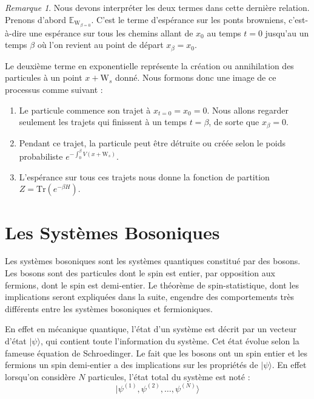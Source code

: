 \documentclass[11pt]{article}
\theoremstyle{definition}
\theoremstyle{remark}
\newtheorem*{remark}{Remarque}
\begin{document}
\begin{remark}
Nous devons interpréter les deux termes dans cette dernière relation. Prenons d'abord $\mathbb{E}_{\mathrm{W}_{\beta=0}}$. C'est le terme d’espérance sur les ponts browniens, c'est-à-dire une espérance sur tous les chemins allant de $x_0$ au temps $t=0$ jusqu'au un temps $\beta$ où l'on revient au point de départ $x_{\beta}=x_0$. 

Le deuxième terme en exponentielle représente la création ou annihilation des particules à un point $x+\mathrm{W}_{s}$ donné. Nous formons donc une image de ce processus comme suivant : 

\begin{enumerate} 

\item 

Le particule commence son trajet à $x_{t=0}=x_0 = 0$. Nous allons regarder seulement les trajets qui finissent à un temps $t=\beta$, de sorte que $x_\beta = 0$.

\item 

Pendant ce trajet, la particule peut être détruite ou créée selon le poids probabiliste $e^{-\int_{0}^{\beta} V(x+\mathrm{W}_{s})}$. 

\item 

L’espérance sur tous ces trajets nous donne la fonction de partition $Z = \mathrm{Tr}(e^{-\beta H})$. 
\end{enumerate}


\end{remark}

\section{Les Systèmes Bosoniques}\label{sec:bosons}

Les systèmes bosoniques sont les systèmes quantiques constitué par des bosons. Les bosons sont des particules dont le spin est entier, par opposition aux fermions, dont le spin est demi-entier. Le théorème de spin-statistique, dont les implications seront expliquées dans la suite, engendre des comportements très différents entre les systèmes bosoniques et fermioniques.

En effet en mécanique quantique, l'état d'un système est décrit par un vecteur d'état $|\psi \rangle$, qui contient toute l'information du système. Cet état évolue selon la fameuse équation de Schroedinger. Le fait que les bosons ont un spin entier et les fermions un spin demi-entier a des implications sur les propriétés de $| \psi \rangle$. En effet lorsqu'on considère $N$ particules, l'état total du système est noté :
\begin{equation}
|\psi^{(1)},\psi^{(2)},\ldots,\psi^{(N)}\rangle
\end{equation}
\end{document}
